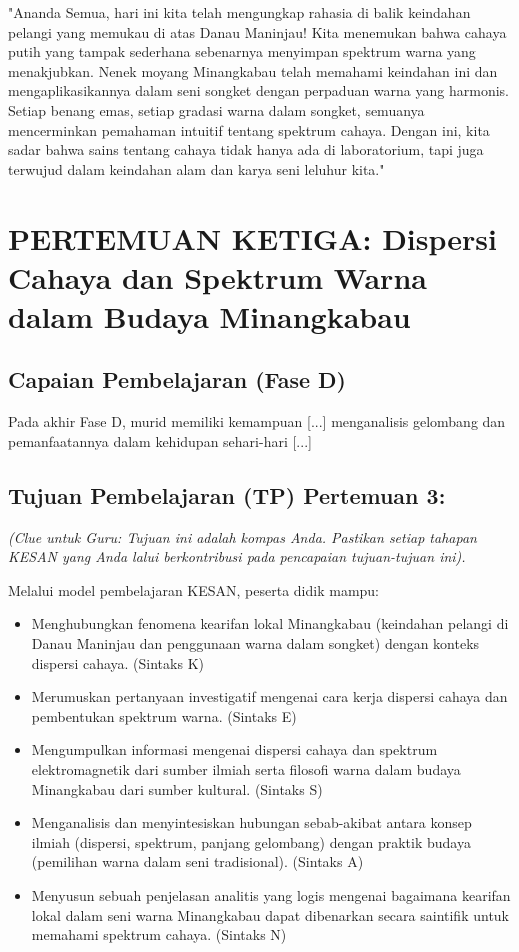 \documentclass[12pt,a4paper]{article}
\begin{document}
"Ananda Semua, hari ini kita telah mengungkap rahasia di balik keindahan pelangi yang memukau di atas Danau Maninjau! Kita menemukan bahwa cahaya putih yang tampak sederhana sebenarnya menyimpan spektrum warna yang menakjubkan. Nenek moyang Minangkabau telah memahami keindahan ini dan mengaplikasikannya dalam seni songket dengan perpaduan warna yang harmonis. Setiap benang emas, setiap gradasi warna dalam songket, semuanya mencerminkan pemahaman intuitif tentang spektrum cahaya. Dengan ini, kita sadar bahwa sains tentang cahaya tidak hanya ada di laboratorium, tapi juga terwujud dalam keindahan alam dan karya seni leluhur kita."

\section{PERTEMUAN KETIGA: Dispersi Cahaya dan Spektrum Warna dalam Budaya Minangkabau}

\subsection{Capaian Pembelajaran (Fase D)}
Pada akhir Fase D, murid memiliki kemampuan [...] menganalisis gelombang dan pemanfaatannya dalam kehidupan sehari-hari [...]

\subsection{Tujuan Pembelajaran (TP) Pertemuan 3:}
\textit{(Clue untuk Guru: Tujuan ini adalah kompas Anda. Pastikan setiap tahapan KESAN yang Anda lalui berkontribusi pada pencapaian tujuan-tujuan ini).}

Melalui model pembelajaran KESAN, peserta didik mampu:
\begin{itemize}
\item Menghubungkan fenomena kearifan lokal Minangkabau (keindahan pelangi di Danau Maninjau dan penggunaan warna dalam songket) dengan konteks dispersi cahaya. (Sintaks K)
\item Merumuskan pertanyaan investigatif mengenai cara kerja dispersi cahaya dan pembentukan spektrum warna. (Sintaks E)
\item Mengumpulkan informasi mengenai dispersi cahaya dan spektrum elektromagnetik dari sumber ilmiah serta filosofi warna dalam budaya Minangkabau dari sumber kultural. (Sintaks S)
\item Menganalisis dan menyintesiskan hubungan sebab-akibat antara konsep ilmiah (dispersi, spektrum, panjang gelombang) dengan praktik budaya (pemilihan warna dalam seni tradisional). (Sintaks A)
\item Menyusun sebuah penjelasan analitis yang logis mengenai bagaimana kearifan lokal dalam seni warna Minangkabau dapat dibenarkan secara saintifik untuk memahami spektrum cahaya. (Sintaks N)
\end{itemize}
\end{document}
